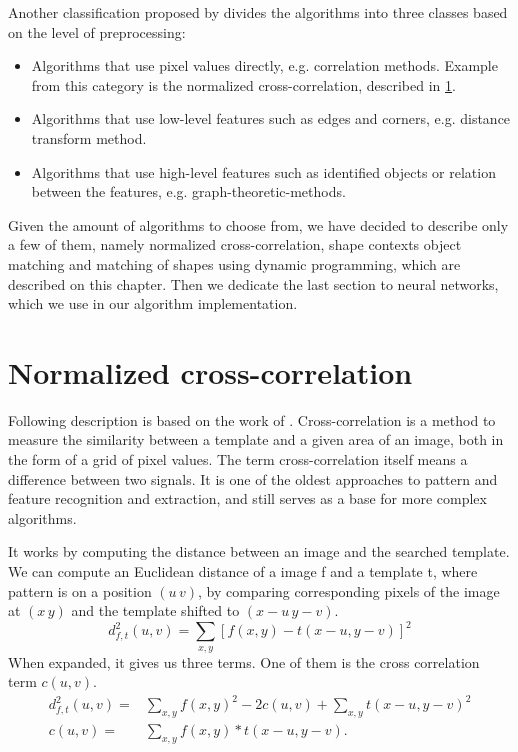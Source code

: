 Another classification proposed by \citet{distanceTransform} divides the algorithms into three classes based on the level of preprocessing:
\begin{itemize}
\item Algorithms that use pixel values directly, e.g. correlation  methods. Example from this category is the normalized cross-correlation, described in \cref{normalizedCC}.
\item Algorithms that use low-level features such as edges and corners, e.g. distance transform method. 
\item Algorithms that use high-level features such as identified objects or relation between the features, e.g. graph-theoretic-methods. 
\end{itemize}

Given the amount of algorithms to choose from, we have decided to describe only a few of them, namely normalized cross-correlation, shape contexts object matching and matching of shapes using dynamic programming, which are described on this chapter. Then we dedicate the last section to neural networks, which we use in our algorithm implementation.

\section{Normalized cross-correlation}
\label{normalizedCC}
Following description is based on the work of \cite{crossCorrLewis}.
Cross-correlation is a method to measure the similarity between a template and a given area of an image, both in the form of a grid of pixel values. The term cross-correlation itself means a difference between two signals. It is one of the oldest approaches to pattern and feature recognition and extraction, and still serves as a base for more complex algorithms.

It works by computing the distance between an image and the searched template. We can compute an Euclidean distance of a image f and a template t, where pattern is on a position $(u\,v)$, by comparing corresponding pixels of the image at $(x\,y)$ and the template shifted to $(x-u\,y-v)$.
\[d_{f,t}^{2}(u,v)=\sum_{x,y} [ f(x,y) - t(x-u, y-v) ]^{2}\]
When expanded, it gives us three terms. One of them is the cross correlation term $c(u,v)$.
\begin{align*}
d_{f,t}^{2}(u,v)=&\sum_{x,y} f(x,y)^{2} - 2c(u,v) + \sum_{x,y} t(x-u, y-v)^2 \\
c(u,v)=&\sum_{x,y} f(x,y) * t(x-u, y-v).
\end{align*}

